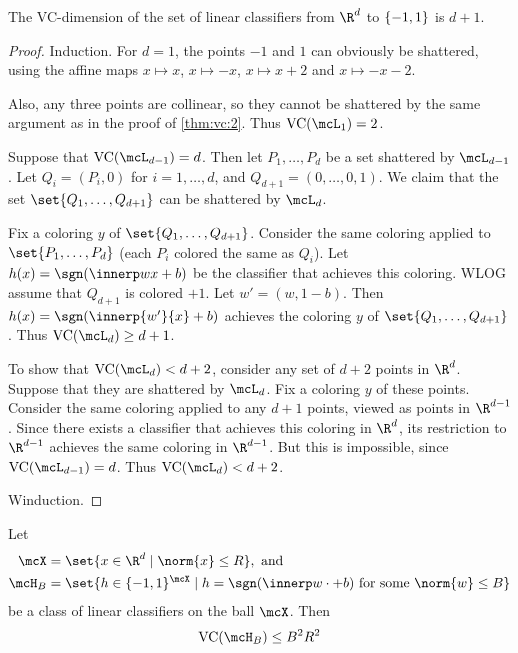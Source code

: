 \begin{theorem*} \label{thm:vc:linear}
    The VC-dimension of the set of linear classifiers from $\R^d$ to $\{-1, 1\}$
    is $d+1$.
\end{theorem*}
\begin{proof}
    Induction.
    For $d = 1$, the points $-1$ and $1$ can obviously be shattered,
    using the affine maps $x \mapsto x$, $x \mapsto -x$, $x \mapsto x + 2$
    and $x \mapsto -x - 2$.

    Also, any three points are collinear, so they cannot be shattered by
    the same argument as in the proof of \cref{thm:vc:2}.
    Thus $\VC(\mcL_1) = 2$.

    Suppose that $\VC(\mcL_{d-1}) = d$.
    Then let $P_1, \dots, P_d$ be a set shattered by $\mcL_{d-1}$.
    Let $Q_i = (P_i, 0)$ for $i = 1, \dots, d$,
    and $Q_{d+1} = (0, \dots, 0, 1)$.
    We claim that the set $\set{Q_1, \dots, Q_{d+1}}$ can be shattered
    by $\mcL_d$.

    Fix a coloring $y$ of $\set{Q_1, \dots, Q_{d+1}}$.
    Consider the same coloring applied to $\set{P_1, \dots, P_d}$
    (each $P_i$ colored the same as $Q_i$).
    Let $h(x) = \sgn(\innerp w x + b)$ be the classifier that achieves this
    coloring.
    WLOG assume that $Q_{d+1}$ is colored $+1$.
    Let $w' = (w, 1-b)$.
    Then $h(x) = \sgn(\innerp{w'}{x} + b)$ achieves the coloring $y$ of
    $\set{Q_1, \dots, Q_{d+1}}$.
    Thus $\VC(\mcL_d) \ge d+1$.

    To show that $\VC(\mcL_d) < d+2$, consider any set of $d+2$ points
    in $\R^d$.
    Suppose that they are shattered by $\mcL_d$.
    Fix a coloring $y$ of these points.
    Consider the same coloring applied to any $d+1$ points, viewed as
    points in $\R^{d-1}$.
    Since there exists a classifier that achieves this coloring in
    $\R^d$, its restriction to $\R^{d-1}$ achieves the same coloring
    in $\R^{d-1}$.
    But this is impossible, since $\VC(\mcL_{d-1}) = d$.
    Thus $\VC(\mcL_d) < d+2$.

    Winduction.
\end{proof}

\begin{fact*} \label{thm:vc:restricted_linear}
    Let \begin{align*}
        \mcX &= \set{x \in \R^d \mid \norm{x} \le R}, \text{ and} \\
        \mcH_B &= \set{h \in \pms^\mcX \mid h = \sgn(\innerp w \cdot + b)
            \text{ for some } \norm{w} \le B}
    \end{align*}
    be a class of linear classifiers on the ball $\mcX$.
    Then \[
        \VC(\mcH_B) \le B^2 R^2
    \]
\end{fact*}

